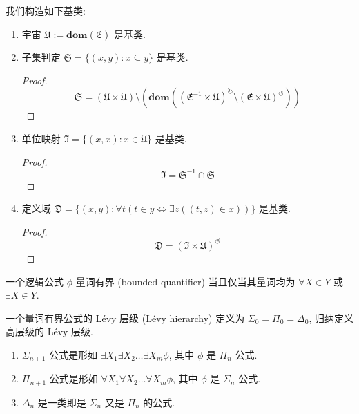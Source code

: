 \begin{definition}
    我们构造如下基类:
    \begin{enumerate}
        \item \label {definition:NBG basic class of universe}
                宇宙 \(\mathfrak{U} := \mathbf{dom} (\mathfrak{E})\) 是基类.
        \item \label {definition:NBG basic class of subset}
                子集判定 \(\mathfrak{S} = \{(x,y) : x \subseteq y\}\) 是基类.

                \begin{proof}
                    \[
                        \mathfrak{S} = (\mathfrak{U} \times \mathfrak{U}) \setminus (\mathbf{dom} ({(\mathfrak{E}^{-1} \times \mathfrak{U})}^{\circlearrowright} \setminus {(\mathfrak{E} \times \mathfrak{U})}^{\circlearrowleft}))
                    \]
                \end{proof}
        \item \label {definition:NBG basic class of id function}
                单位映射 \(\mathfrak{I} = \{(x,x) : x \in \mathfrak{U}\}\) 是基类.

                \begin{proof}
                    \[
                        \mathfrak{I} = \mathfrak{S}^{-1} \cap \mathfrak{S}
                    \]
                \end{proof}
        \item \label {definition:NBG basic class of domain}
                定义域 \(\mathfrak{D} = \{(x,y) : \forall t (t \in y \Leftrightarrow \exists z ((t,z) \in x))\}\) 是基类.

                \begin{proof}
                    \[
                        \mathfrak{D} = {(\mathfrak{I} \times \mathfrak{U})}^{\circlearrowleft}
                    \]
                \end{proof}
    \end{enumerate}
\end{definition}

\begin{definition*}[Lévy 层级]
    \label {definition:Lévy hierarchy}
    一个逻辑公式 \(\phi\) 量词有界 (bounded quantifier) 当且仅当其量词均为 \(\forall X \in Y\) 或 \(\exists X \in Y\).

    一个量词有界公式的 Lévy 层级 (Lévy hierarchy) 定义为 \(\Sigma_0 = \Pi_0 = \Delta_0\), 归纳定义高层级的 Lévy 层级.

    \begin{enumerate}
        \item \(\Sigma_{n + 1}\) 公式是形如 \(\exists X_1 \exists X_2 \dots \exists X_m \phi\), 其中 \(\phi\) 是 \(\Pi_n\) 公式.
        \item \(\Pi_{n + 1}\) 公式是形如 \(\forall X_1 \forall X_2 \dots \forall X_m \phi\), 其中 \(\phi\) 是 \(\Sigma_n\) 公式.
        \item \(\Delta_{n}\) 是一类即是 \(\Sigma_n\) 又是 \(\Pi_n\) 的公式.
    \end{enumerate}
\end{definition*}

